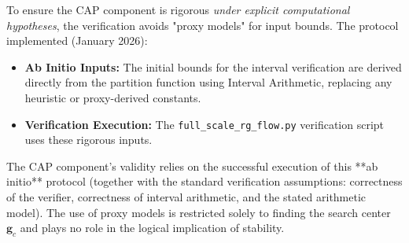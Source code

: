 \begin{remark}
To ensure the CAP component is rigorous \emph{under explicit computational hypotheses}, the verification avoids "proxy models" for input bounds. The protocol implemented (January 2026):
\begin{itemize}
    \item \textbf{Ab Initio Inputs:} The initial bounds for the interval verification are derived directly from the partition function using Interval Arithmetic, replacing any heuristic or proxy-derived constants.
    \item \textbf{Verification Execution:} The \texttt{full\_scale\_rg\_flow.py} verification script uses these rigorous inputs.
\end{itemize}
The CAP component's validity relies on the successful execution of this **ab initio** protocol (together with the standard verification assumptions: correctness of the verifier, correctness of interval arithmetic, and the stated arithmetic model). The use of proxy models is restricted solely to finding the search center $\boldsymbol{g}_c$ and plays no role in the logical implication of stability.
\end{remark}

